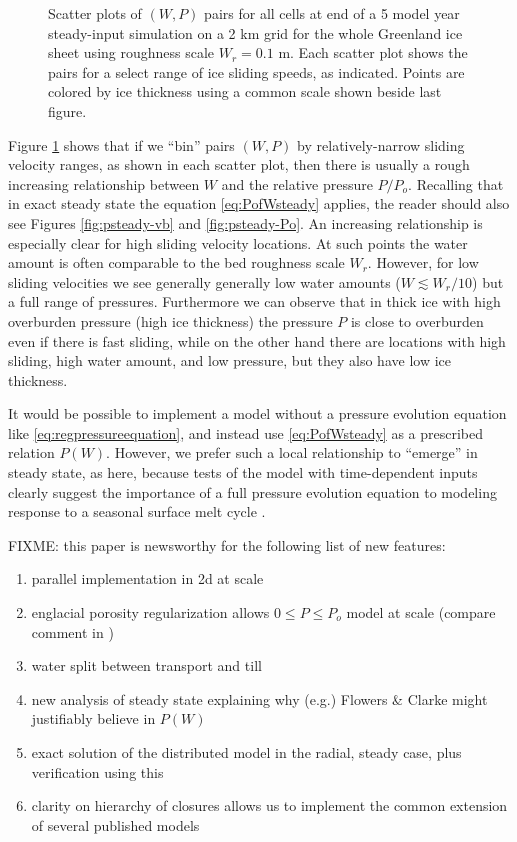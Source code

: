 \documentclass[gmd]{copernicus}   %
\begin{document}
\begin{figure}[ht]
\caption{Scatter plots of $(W,P)$ pairs for all cells at end of a 5 model year steady-input simulation on a 2 km grid for the whole Greenland ice sheet using roughness scale $W_r = 0.1$ m.  Each scatter plot shows the pairs for a select range of ice sliding speeds, as indicated.  Points are colored by ice thickness using a common scale shown beside last figure.}
\label{fig:GreenisPofW}
\end{figure}

Figure \ref{fig:GreenisPofW} shows that if we ``bin'' pairs $(W,P)$ by relatively-narrow sliding velocity ranges, as shown in each scatter plot, then there is usually a rough increasing relationship between $W$ and the relative pressure $P/P_o$.  Recalling that in exact steady state the equation \eqref{eq:PofWsteady} applies, the reader should also see Figures \ref{fig:psteady-vb} and \ref{fig:psteady-Po}.  An increasing relationship is especially clear for high sliding velocity locations.  At such points the water amount is often comparable to the bed roughness scale $W_r$.  However, for low sliding velocities we see generally generally low water amounts ($W \lesssim W_r/10$) but a full range of pressures.  Furthermore we can observe that in thick ice with high overburden pressure (high ice thickness) the pressure $P$ is close to overburden even if there is fast sliding, while on the other hand there are locations with high sliding, high water amount, and low pressure, but they also have low ice thickness.

It would be possible to implement a model without a pressure evolution equation like \eqref{eq:regpressureequation}, and instead use \eqref{eq:PofWsteady} as a prescribed relation $P(W)$.  However, we prefer such a local relationship to ``emerge'' in steady state, as here, because tests of the model with time-dependent inputs clearly suggest the importance of a full pressure evolution equation to modeling response to a seasonal surface melt cycle \citep{vanPeltthesis}.


\conclusions  \label{sec:conclusion}


FIXME: this paper is newsworthy for the following list of new features:\begin{enumerate}
\item parallel implementation in 2d at scale
\item englacial porosity regularization allows $0\le P \le P_o$ model at scale (compare comment in \cite{Werderetal2013})
\item water split between transport and till
\item new analysis of steady state explaining why (e.g.) Flowers \& Clarke might justifiably believe in $P(W)$
\item exact solution of the distributed model in the radial, steady case, plus verification using this 
\item clarity on hierarchy of closures allows us to implement the common extension of several published models
\end{enumerate}
\end{document}
